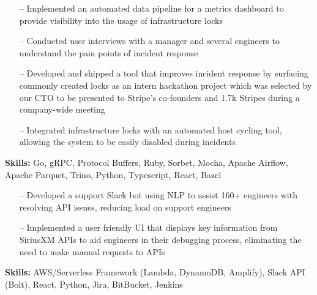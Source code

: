 \documentclass[9pt,a4paper]{altacv}
\begin{document}
\divider


\begin{itemize}
    \setlength{\itemindent}{0.5em}
    \item[--] Implemented an automated data pipeline for a metrics dashboard to provide visibility into the usage of infrastructure locks
    \item[--] Conducted user interviews with a manager and several engineers to understand the pain points of incident response
    \item[--] Developed and shipped a tool that improves incident response by surfacing commonly created locks as an intern hackathon project which was selected by our CTO to be presented to Stripe's co-founders and 1.7k Stripes during a company-wide meeting
    \item[--] Integrated infrastructure locks with an automated host cycling tool, allowing the system to be easily disabled during incidents
\end{itemize}
\smallskip
\textbf{Skills:} Go, gRPC, Protocol Buffers, Ruby, Sorbet, Mocha, Apache Airflow, Apache Parquet, Trino, Python, Typescript, React, Bazel

\divider


\begin{itemize}
    \setlength{\itemindent}{0.5em}
    \item[--] Developed a support Slack bot using NLP to assist 160+ engineers with resolving API issues, reducing load on support engineers
    \item[--] Implemented a user friendly UI that displays key information from SiriusXM APIs to aid engineers in their debugging process, eliminating the need to make manual requests to APIs
\end{itemize}
\smallskip
\textbf{Skills:} AWS/Serverless Framework (Lambda, DynamoDB, Amplify), Slack API (Bolt), React, Python, Jira, BitBucket, Jenkins
\end{document}
